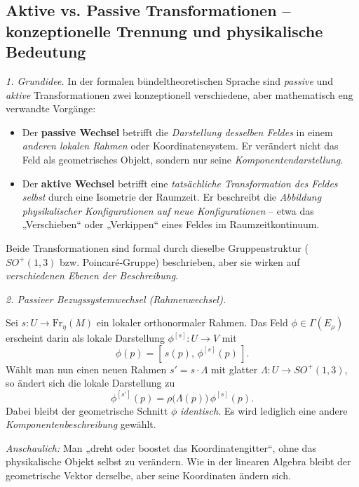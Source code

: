 \documentclass[10pt, letterpaper]{article}
\begin{document}
\pagebreak

\subsection{Aktive vs. Passive Transformationen – konzeptionelle Trennung und physikalische Bedeutung}

\emph{1. Grundidee.}
In der formalen bündeltheoretischen Sprache sind \emph{passive} und \emph{aktive} Transformationen
zwei konzeptionell verschiedene, aber mathematisch eng verwandte Vorgänge:

\begin{itemize}
  \item Der \textbf{passive Wechsel} betrifft die \emph{Darstellung desselben Feldes}
  in einem \emph{anderen lokalen Rahmen} oder Koordinatensystem.
  Er verändert nicht das Feld als geometrisches Objekt, sondern nur seine \emph{Komponentendarstellung}.

  \item Der \textbf{aktive Wechsel} betrifft eine \emph{tatsächliche Transformation des Feldes selbst}
  durch eine Isometrie der Raumzeit.
  Er beschreibt die \emph{Abbildung physikalischer Konfigurationen auf neue Konfigurationen}
  – etwa das „Verschieben“ oder „Verkippen“ eines Feldes im Raumzeitkontinuum.
\end{itemize}

Beide Transformationen sind formal durch dieselbe Gruppenstruktur
($SO^+(1,3)$ bzw. Poincaré-Gruppe) beschrieben,
aber sie wirken auf \emph{verschiedenen Ebenen der Beschreibung}.

\bigskip
\emph{2. Passiver Bezugssystemwechsel (Rahmenwechsel).}

Sei $s:U\to \mathrm{Fr}_\eta(M)$ ein lokaler orthonormaler Rahmen.
Das Feld $\phi\in\Gamma(E_\rho)$ erscheint darin als lokale Darstellung
$\phi^{[s]}:U\to V$ mit
\[
\phi(p) = [\,s(p),\,\phi^{[s]}(p)\,].
\]
Wählt man nun einen neuen Rahmen $s' = s\cdot\Lambda$ mit glatter $\Lambda:U\to SO^+(1,3)$, so
ändert sich die lokale Darstellung zu
\[
\boxed{\quad
\phi^{[s']}(p)=\rho\!\big(\Lambda(p)\big)\,\phi^{[s]}(p).
\quad}
\]
Dabei bleibt der geometrische Schnitt $\phi$ \emph{identisch}.
Es wird lediglich eine andere \emph{Komponentenbeschreibung} gewählt.

\smallskip
\emph{Anschaulich:}
Man „dreht oder boostet das Koordinatengitter“, ohne das physikalische Objekt selbst zu verändern.
Wie in der linearen Algebra bleibt der geometrische Vektor derselbe, aber seine Koordinaten ändern sich.
\end{document}

